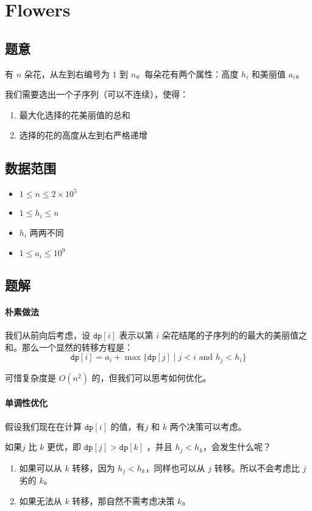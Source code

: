 \section{Flowers}
\subsection*{题意}
有 $n$ 朵花，从左到右编号为 $1$ 到 $n$。每朵花有两个属性：高度 $h_i$ 和美丽值 $a_i$。

我们需要选出一个子序列（可以不连续），使得：
\begin{enumerate}
\item 最大化选择的花美丽值的总和 
\item 选择的花的高度从左到右严格递增
\end{enumerate}
\subsection*{数据范围}
\begin{itemize}
\item $1 \leq n \leq 2 \times 10^5$
\item $1 \leq h_i \leq n$
\item $h_i$ 两两不同
\item $1 \leq a_i \leq 10^9$
\end{itemize}

\subsection*{题解}

\paragraph{朴素做法}
我们从前向后考虑，设 $\texttt{dp}[i]$ 表示以第 $i$ 朵花结尾的子序列的的最大的美丽值之和。那么一个显然的转移方程是：
$$
\texttt{dp}[i] = a_i + \max\{\texttt{dp}[j]\mid j<i \text{ and } h_j < h_i\}
$$

可惜复杂度是 $O(n^2)$ 的，但我们可以思考如何优化。

\paragraph{单调性优化}
假设我们现在在计算 $\texttt{dp}[i]$ 的值，有$j$ 和 $k$ 两个决策可以考虑。 

如果$j$ 比 $k$ 更优，即 $\texttt{dp}[j] > \texttt{dp}[k]$ ，并且 $h_j < h_k$，会发生什么呢？
\begin{enumerate}
\item 如果可以从 $k$ 转移，因为 $h_j < h_k $，同样也可以从 $j$ 转移。所以不会考虑比 $j$ 劣的 $k$。
\item 如果无法从 $k$ 转移，那自然不需考虑决策 $k$。
\end{enumerate}

